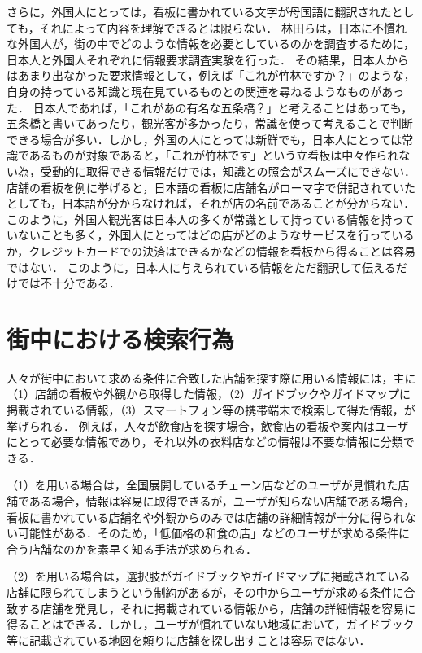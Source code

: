     さらに，外国人にとっては，看板に書かれている文字が母国語に翻訳されたとしても，それによって内容を理解できるとは限らない．
    林田らは，日本に不慣れな外国人が，街の中でどのような情報を必要としているのかを調査するために，日本人と外国人それぞれに情報要求調査実験を行った\cite{Hayashida:2005}．
    その結果，日本人からはあまり出なかった要求情報として，例えば「これが竹林ですか？」のような，自身の持っている知識と現在見ているものとの関連を尋ねるようなものがあった．
    日本人であれば，「これがあの有名な五条橋？」と考えることはあっても，五条橋と書いてあったり，観光客が多かったり，常識を使って考えることで判断できる場合が多い．しかし，外国の人にとっては新鮮でも，日本人にとっては常識であるものが対象であると，「これが竹林です」という立看板は中々作られない為，受動的に取得できる情報だけでは，知識との照会がスムーズにできない．
    店舗の看板を例に挙げると，日本語の看板に店舗名がローマ字で併記されていたとしても，日本語が分からなければ，それが店の名前であることが分からない．
    このように，外国人観光客は日本人の多くが常識として持っている情報を持っていないことも多く，外国人にとってはどの店がどのようなサービスを行っているか，クレジットカードでの決済はできるかなどの情報を看板から得ることは容易ではない．
    このように，日本人に与えられている情報をただ翻訳して伝えるだけでは不十分である．

\section{街中における検索行為}
\label{section:searching_action}
  人々が街中において求める条件に合致した店舗を探す際に用いる情報には，主に（1）店舗の看板や外観から取得した情報，（2）ガイドブックやガイドマップに掲載されている情報，（3）スマートフォン等の携帯端末で検索して得た情報，が挙げられる．
  例えば，人々が飲食店を探す場合，飲食店の看板や案内はユーザにとって必要な情報であり，それ以外の衣料店などの情報は不要な情報に分類できる．

  （1）を用いる場合は，全国展開しているチェーン店などのユーザが見慣れた店舗である場合，情報は容易に取得できるが，ユーザが知らない店舗である場合，看板に書かれている店舗名や外観からのみでは店舗の詳細情報が十分に得られない可能性がある．そのため，「低価格の和食の店」などのユーザが求める条件に合う店舗なのかを素早く知る手法が求められる．

  （2）を用いる場合は，選択肢がガイドブックやガイドマップに掲載されている店舗に限られてしまうという制約があるが，その中からユーザが求める条件に合致する店舗を発見し，それに掲載されている情報から，店舗の詳細情報を容易に得ることはできる．しかし，ユーザが慣れていない地域において，ガイドブック等に記載されている地図を頼りに店舗を探し出すことは容易ではない．

